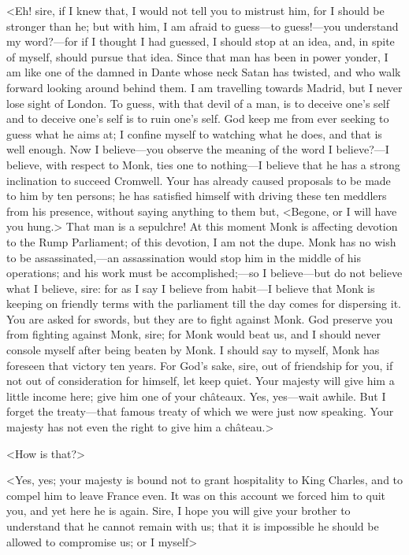 <Eh! sire, if I knew that, I would not tell you to mistrust him, for I should be stronger than he; but with him, I am afraid to guess—to guess!—you understand my word?—for if I thought I had guessed, I should stop at an idea, and, in spite of myself, should pursue that idea. Since that man has been in power yonder, I am like one of the damned in Dante whose neck Satan has twisted, and who walk forward looking around behind them. I am travelling towards Madrid, but I never lose sight of London. To guess, with that devil of a man, is to deceive one's self and to deceive one's self is to ruin one's self. God keep me from ever seeking to guess what he aims at; I confine myself to watching what he does, and that is well enough. Now I believe—you observe the meaning of the word I believe?—I believe, with respect to Monk, ties one to nothing—I believe that he has a strong inclination to succeed Cromwell. Your  has already caused proposals to be made to him by ten persons; he has satisfied himself with driving these ten meddlers from his presence, without saying anything to them but, <Begone, or I will have you hung.> That man is a sepulchre! At this moment Monk is affecting devotion to the Rump Parliament; of this devotion, I am not the dupe. Monk has no wish to be assassinated,—an assassination would stop him in the middle of his operations; and his work must be accomplished;—so I believe—but do not believe what I believe, sire: for as I say I believe from habit—I believe that Monk is keeping on friendly terms with the parliament till the day comes for dispersing it. You are asked for swords, but they are to fight against Monk. God preserve you from fighting against Monk, sire; for Monk would beat us, and I should never console myself after being beaten by Monk. I should say to myself, Monk has foreseen that victory ten years. For God's sake, sire, out of friendship for you, if not out of consideration for himself, let  keep quiet. Your majesty will give him a little income here; give him one of your châteaux. Yes, yes—wait awhile. But I forget the treaty—that famous treaty of which we were just now speaking. Your majesty has not even the right to give him a château.>

<How is that?>

<Yes, yes; your majesty is bound not to grant hospitality to King Charles, and to compel him to leave France even. It was on this account we forced him to quit you, and yet here he is again. Sire, I hope you will give your brother to understand that he cannot remain with us; that it is impossible he should be allowed to compromise us; or I myself\longdash>

